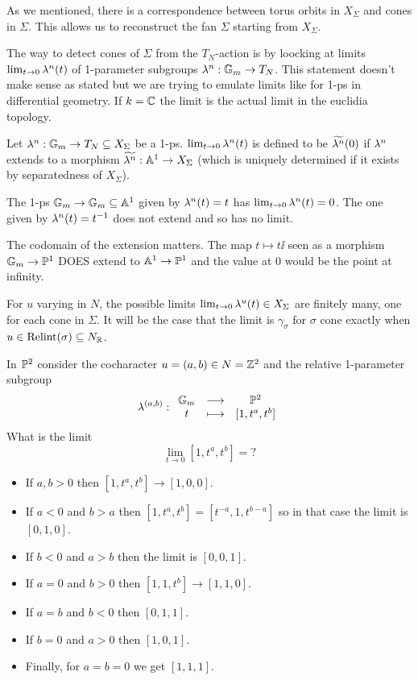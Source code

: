 As we mentioned, there is a correspondence between torus orbits in $X_\Sigma$ and cones in $\Sigma$. This allows us to reconstruct the fan $\Sigma$ starting from $X_\Sigma$.

The way to detect cones of $\Sigma$ from the $T_N$-action is by loocking at limits $\lim_{t\to 0}\lambda^n(t)$ of 1-parameter subgroups $\lambda^n:\mathbb{G}_m\to T_N$. This statement doesn't make sense as stated but we are trying to emulate limits like for 1-ps in differential geometry. If $k=\mathbb{C}$ the limit is the actual limit in the euclidia topology.


\begin{definition}[]
Let $\lambda^n:\mathbb{G}_m\to T_N\subseteq X_\Sigma$ be a 1-ps. $\lim_{t\to 0}\lambda^n(t)$ is defined to be $\widetilde{\lambda^n}(0)$ if $\lambda^n$ extends to a morphism $\widetilde{\lambda^n}:\mathbb{A}^1\to X_\Sigma$ (which is uniquely determined if it exists by separatedness of $X_\Sigma$).
\end{definition}

\begin{example}
The 1-ps $\mathbb{G}_m\to \mathbb{G}_m\subseteq \mathbb{A}^1$ given by $\lambda^n(t)=t$ has $\lim_{t\to 0}\lambda^n(t)=0$. The one given by $\lambda^n(t)=t^{-1}$ does not extend and so has no limit.
\end{example}

\begin{remark}
The codomain of the extension matters. The map $t\mapsto t\ii$ seen as a morphism $\mathbb{G}_m\to \mathbb{P}^1$ DOES extend to $\mathbb{A}^1\to \mathbb{P}^1$ and the value at $0$ would be the point at infinity.
\end{remark}

For $u$ varying in $N$, the possible limits $\lim_{t\to 0}\lambda^u(t)\in X_\Sigma$ are finitely many, one for each cone in $\Sigma$. It will be the case that the limit is $\gamma_\sigma$ for $\sigma$ cone exactly when $u\in \operatorname{Relint}(\sigma)\subseteq N_{\mathbb{R}}$.



\begin{example}
In $\mathbb{P}^2$ consider the cocharacter $u=(a,b)\in N=\mathbb{Z}^2$ and the relative 1-parameter subgroup 
\[\lambda^{(a,b)}:\begin{array}{ccc} {\mathbb{G}_m} & \longrightarrow & {\mathbb{P}^2}\\ {t} & \longmapsto & {[1,t^a,t^b]} \end{array}\]
What is the limit
\[\lim_{t\to 0}[1,t^a,t^b]=?\]
\begin{itemize}
	\item If $a,b>0$ then $[1,t^a,t^b]\to [1,0,0]$.
	\item If $a<0$ and $b>a$ then $[1,t^a,t^b]=[t^{-a},1,t^{b-a}]$ so in that case the limit is $[0,1,0]$. 
	\item If $b<0$ and $a>b$ then the limit is $[0,0,1]$.
	\item If $a=0$ and $b>0$ then $[1,1,t^b]\to [1,1,0]$.
	\item If $a=b$ and $b<0$ then $[0,1,1]$.
	\item If $b=0$ and $a>0$ then $[1,0,1]$.
	\item Finally, for $a=b=0$ we get $[1,1,1]$.
\end{itemize}
\end{example}

